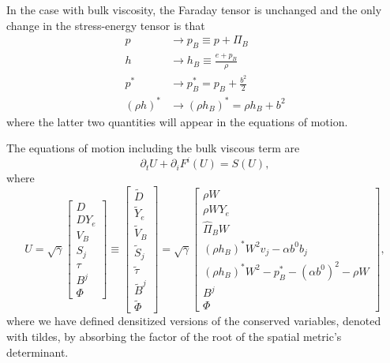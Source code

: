 \documentclass[12pt]{article}
\numberwithin{equation}{section}
\begin{document}
In the case with bulk viscosity, the Faraday tensor is unchanged and the only change in the stress-energy tensor is that
\begin{equation}
\begin{aligned}
p &\to p_B \equiv p + \Pi_B \\
h &\to h_B \equiv \frac{e + p_B}{\rho} \\
p^* &\to p_B^* = p_B + \frac{b^2}{2} \\
(\rho h)^* &\to (\rho h_B)^* = \rho h_B + b^2
\end{aligned}
\end{equation}
where the latter two quantities will appear in the equations of motion. 

The equations of motion including the bulk viscous term are
\begin{equation}
\partial_t U + \partial_i F^i(U) = S(U),
\end{equation}
where
\begin{equation}
U = \sqrt{\gamma}
\begin{bmatrix}
D \\
D Y_e \\
V_B \\
S_j \\
\tau \\
B^j \\
\Phi
\end{bmatrix}
\equiv
\begin{bmatrix}
\tilde{D} \\
\tilde{Y}_e \\
\tilde{V}_B \\
\tilde{S}_j \\
\tilde{\tau} \\
\tilde{B}^j \\
\tilde{\Phi}
\end{bmatrix}
=
\sqrt{\gamma}
\begin{bmatrix}
\rho W \\
\rho W Y_e \\
\hat{\Pi}_B W \\
(\rho h_B)^* W^2 v_j - \alpha b^0 b_j \\
(\rho h_B)^* W^2 - p_B^* - (\alpha b^0)^2 - \rho W \\
B^j \\
\Phi
\end{bmatrix},
\end{equation}
where we have defined densitized versions of the conserved variables, denoted with tildes, by absorbing the factor of the root of the spatial metric's determinant.
\end{document}
